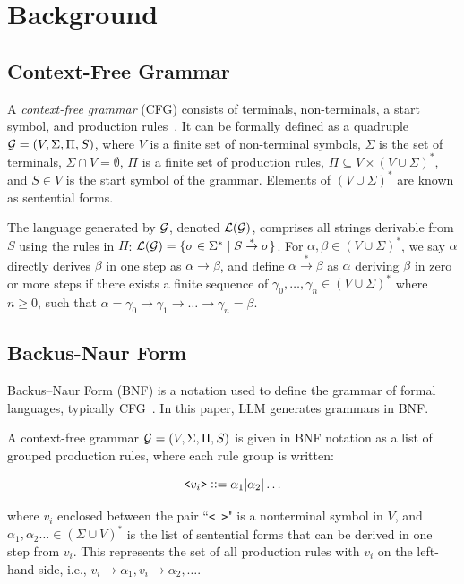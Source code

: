 \section{Background}
\subsection{Context-Free Grammar}

A \emph{context-free grammar} (CFG) consists of terminals, non-terminals, a start symbol, and production rules~\cite{hopcroft2001introduction, Aho_Aho_2007}. It can be formally defined as a quadruple $\mathcal{G} = (V, \Sigma, \Pi, S)$, where $V$ is a finite set of non-terminal symbols, $\Sigma$ is the set of terminals, $\Sigma \cap V = \emptyset$, $\Pi$ is a finite set of production rules, $\Pi \subseteq V \times (V \cup \Sigma)^\ast$, and $S \in V$ is the start symbol of the grammar.
Elements of $(V \cup \Sigma)^*$ are known as sentential forms.

The language generated by $\mathcal{G}$, denoted $\mathcal{L}(\mathcal{G})$, comprises all strings derivable from $S$ using the rules in $\Pi$: 
$
\mathcal{L}(\mathcal{G}) = \{ \sigma \in \Sigma^\ast \mid S \stackrel{*}{\rightarrow} \sigma \}
$. For $\alpha,\beta \in (V\cup \Sigma)^*$, we say $\alpha$ directly derives $\beta$ in one step as $\alpha {\rightarrow} \beta$, and define $\alpha \stackrel{*}{\rightarrow} \beta$ as $\alpha$ deriving $\beta$ in zero or more steps if there exists a finite sequence of $\gamma_0,\dots,\gamma_n \in (V \cup \Sigma)^*$ where $n\geq 0$, such that $\alpha = \gamma_0 \rightarrow \gamma_1 \rightarrow \dots \rightarrow \gamma_n = \beta$.


\subsection{Backus-Naur Form}
\label{sec:bnf_background}
Backus–Naur Form (BNF) is a notation used to define the grammar of formal languages, typically CFG~\cite{Chomsky_1956,backus1959syntax,backus1960report}.  
In this paper, LLM generates grammars in BNF. 

A context-free grammar $\mathcal{G} = (V, \Sigma, \Pi, S)$ is given in BNF notation as a list of grouped production rules, where each rule group is written:

$$\texttt{<$v_i$>}\vcentcolon\vcentcolon=\alpha_1 | \alpha_2 | \ldots$$

where $v_i$ enclosed between the pair ``\texttt{< >}" is a nonterminal symbol in $V$, and $\alpha_1, \alpha_2 \ldots \in (\Sigma \cup V)^*$ is the list of sentential forms that can be derived in one step from $v_i$. This represents the set of all production rules with $v_i$ on the left-hand side, i.e., $v_i \rightarrow \alpha_1, v_i \rightarrow \alpha_2, \ldots$. 

